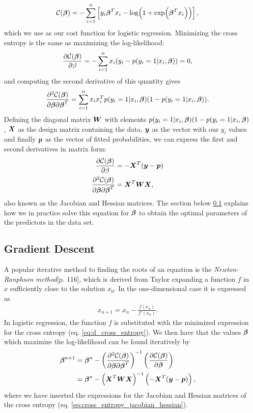 \begin{align}
    \mathcal{C}(\boldsymbol{\beta}) = - \sum_{i=1}^n \left[ y_i\boldsymbol{\beta}^Tx_i - \log(1 + \exp(\boldsymbol{\beta}^Tx_i)) \right],
\end{align}
which we use as our cost function for logistic regression. Minimizing the cross entropy is the same as maximizing the log-likelihood:
\begin{align}
    \pdv{\mathcal{C}(\boldsymbol{\beta})}{\beta} = - \sum_{i=1}^n x_i(y_i - p(y_i=1 | x_i, \boldsymbol{\beta})) = 0,
    \label{eq:d_cross_entropy}
\end{align}
and computing the second derivative of this quantity gives
\begin{align}
    \pdv{\mathcal{C}(\boldsymbol{\beta})}{\boldsymbol{\beta}}{\boldsymbol{\beta}^T} = \sum_{i=1}^n x_ix_i^T p(y_i = 1 | x_i, \boldsymbol{\beta})(1 - p(y_i = 1 | x_i, \boldsymbol{\beta})).
\end{align}
Defining the diagonal matrix $\boldsymbol{W}$ with elements $p(y_i = 1 | x_i, \boldsymbol{\beta})(1 - p(y_i = 1 | x_i, \boldsymbol{\beta})$, $\boldsymbol{X}$ as the design matrix containing the data, $\boldsymbol{y}$ as the vector with our $y_i$ values and finally $\boldsymbol{p}$ as the vector of fitted probabilities, we can express the first and second derivatives in matrix form: 
\begin{align}
    \label{eq:cross_entropy_jacobian_hessian}
    \pdv{\mathcal{C}(\boldsymbol{\beta})}{\beta} &= -\boldsymbol{X}^T(\boldsymbol{y} - \boldsymbol{p})\\
    \pdv{\mathcal{C}(\boldsymbol{\beta})}{\boldsymbol{\beta}}{\boldsymbol{\beta}^T} &= \boldsymbol{X}^T\boldsymbol{WX},
\end{align}
also known as the Jacobian and Hessian matrices. The section below \ref{sec:gradient_descent} explains how we in practice solve this equation for $\boldsymbol{\beta}$ to obtain the optimal parameters of the predictors in the data set.

\subsection{Gradient Descent}\label{sec:gradient_descent}
A popular iterative method to finding the roots of an equation is the \textit{Newton-Ranphson method}\cite{Faul}[p. 116], which is derived from Taylor expanding a function $f$ in $x$ sufficiently close to the solution $x_0$. In the one-dimensional case it is expressed as 
\begin{align}
    x_{n+1} = x_n - \frac{f(x_n)}{f'(x_n)}.
\end{align}
In logistic regression, the function $f$ is substituted with the minimized expression for the cross entropy (eq. \ref{eq:d_cross_entropy}). We then have that the values $\boldsymbol{\beta}$ which maximize the log-likelihood can be found iteratively by
\begin{align}
\label{eq:newtons_method}
    \boldsymbol{\beta}^{n+1} &= \boldsymbol{\beta}^n - \left(\pdv{\mathcal{C}(\boldsymbol{\beta})}{\boldsymbol{\beta}}{\boldsymbol{\beta}^T}\right)^{-1}\left(\pdv{\mathcal{C}(\boldsymbol{\beta})}{\boldsymbol{\beta}}\right)\\
    &= \boldsymbol{\beta}^n - \left( \boldsymbol{X}^T\boldsymbol{WX} \right)^{-1} \left( -\boldsymbol{X}^T(\boldsymbol{y} - \boldsymbol{p}) \right),
\end{align}
where we have inserted the expressions for the Jacobian and Hessian matrices of the cross entropy (eq. \ref{eq:cross_entropy_jacobian_hessian}).

